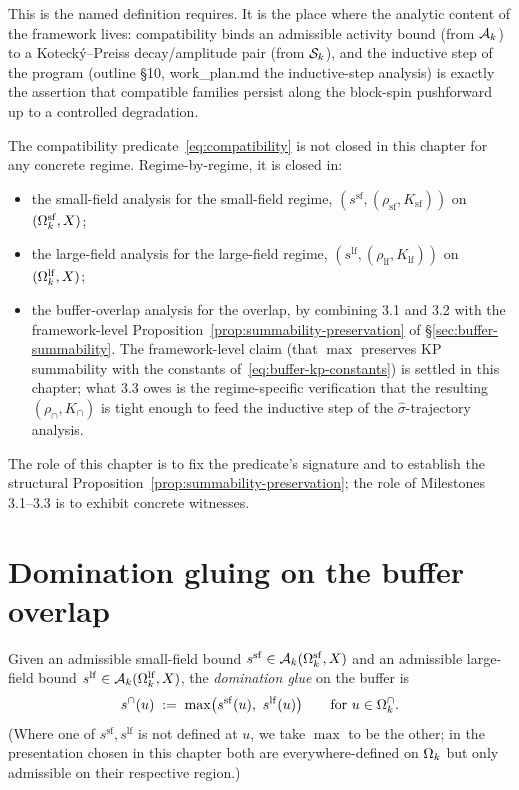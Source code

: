 This is the named definition  requires.  It is the place where the analytic content of the framework lives: compatibility binds an admissible activity bound (from $\mathcal{A}_k$) to a Kotecký--Preiss decay/amplitude pair (from $\mathcal{S}_k$), and the inductive step of the program (outline \S10, work\_plan.md the inductive-step analysis) is exactly the assertion that compatible families persist along the block-spin pushforward up to a controlled degradation.

\begin{remark}
\label{rem:where-closed}
The compatibility predicate~\eqref{eq:compatibility} is not closed in this chapter for any concrete regime.  Regime-by-regime, it is closed in:
\begin{itemize}
  \item the small-field analysis for the small-field regime, $(s^{\mathrm{sf}}, (\rho_{\mathrm{sf}}, K_{\mathrm{sf}}))$ on $(\Omega_k^{\mathrm{sf}}, X)$;
  \item the large-field analysis for the large-field regime, $(s^{\mathrm{lf}}, (\rho_{\mathrm{lf}}, K_{\mathrm{lf}}))$ on $(\Omega_k^{\mathrm{lf}}, X)$;
  \item the buffer-overlap analysis for the overlap, by combining 3.1 and 3.2 with the framework-level Proposition~\ref{prop:summability-preservation} of \S\ref{sec:buffer-summability}.  The framework-level claim (that $\max$ preserves KP summability with the constants of~\eqref{eq:buffer-kp-constants}) is settled in this chapter; what 3.3 owes is the regime-specific verification that the resulting $(\rho_{\cap}, K_{\cap})$ is tight enough to feed the inductive step of the $\widehat\sigma$-trajectory analysis.
\end{itemize}
The role of this chapter is to fix the predicate's signature and to establish the structural Proposition~\ref{prop:summability-preservation}; the role of Milestones 3.1--3.3 is to exhibit concrete witnesses.
\end{remark}

\section{Domination gluing on the buffer overlap}
\label{sec:gluing}

\begin{definition}
\label{def:domGlue}
Given an admissible small-field bound $s^{\mathrm{sf}} \in \mathcal{A}_k(\Omega_k^{\mathrm{sf}}, X)$ and an admissible large-field bound $s^{\mathrm{lf}} \in \mathcal{A}_k(\Omega_k^{\mathrm{lf}}, X)$, the \emph{domination glue} on the buffer is
\begin{equation}
  \label{eq:domGlue}
  s^{\cap}(u) \;:=\; \max\!\big( s^{\mathrm{sf}}(u),\ s^{\mathrm{lf}}(u) \big)
  \qquad \text{for } u \in \Omega_k^{\cap}.
\end{equation}
(Where one of $s^{\mathrm{sf}}, s^{\mathrm{lf}}$ is not defined at $u$, we take $\max$ to be the other; in the presentation chosen in this chapter both are everywhere-defined on $\Omega_k$ but only admissible on their respective region.)
\end{definition}

